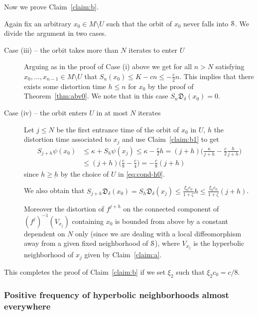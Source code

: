 \documentclass[reqno,12pt,a4paper]{amsart}
\theoremstyle{plain}
\theoremstyle{definition}
\begin{document}
Now we prove Claim~\ref{claim:b}.

Again fix an arbitrary $x_0\in M\setminus U$ such that the
orbit of $x_0$ never falls into ${\EuScript{S}}$. We divide the
argument in two cases.

\begin{description}
\item[Case (iii) -- the orbit takes more than $N$ iterates
  to enter $U$] Arguing as in the proof of Case (i) above we
  get for all $n > N$ satisfying $x_0,\dots, x_{n-1}\in
  M\setminus U$ that $ S_n(x_0)\le K - cn \le -\frac{c}2 n.$
  This implies that there exists some distortion time $h\le
  n$ for $x_0$ by the proof of Theorem~\ref{thm:abv0}. We
  note that in this case $S_n{{\mathfrak D}}_{\delta}(x_0)=0$.

\item[Case (iv) -- the orbit enters $U$ in at most $N$
  iterates] Let $j\le N$ be the first entrance time of the
  orbit of $x_0$ in $U$, $h$ the distortion time associated
  to $x_j$ and use Claim~\ref{claim:b1} to get
\begin{align*}
  S_{j+h}\psi(x_0)
  &\le
  \kappa + S_{h}\psi(x_{j})
  \le
  \kappa- \frac{c}2 h
  =
  (j+h)\Big( \frac{\kappa}{j+h}
  - \frac{c}2\frac{h}{j+h} \Big)
    \\
  &\le
  (j+h)\Big( \frac{c}8 - \frac{c}4\Big)=-\frac{c}8 (j+h)
\end{align*}
since $h\ge\underbar h$ by the choice of $U$ in
\eqref{eq:cond-h0}.

We also obtain that
$S_{j+h}{{\mathfrak D}}_{\delta}(x_0)=S_h{{\mathfrak D}}_\delta(x_j)\le
\frac{\xi_0c_0}{1+\zeta} h\le \frac{\xi_0c_0}{1+\zeta} (j+h)$.

Moreover the distortion of $f^{j+h}$ on the connected
component of $(f^j)^{-1}(V_{x_j})$ containing $x_0$ is
bounded from above by a constant dependent on $N$ only
(since we are dealing with a local diffeomorphism away from
a given fixed neighborhood of ${\EuScript{S}}$), where $V_{x_j}$ is the
hyperbolic neighborhood of $x_j$ given by
Claim~\ref{claim:a}.
\end{description}

This completes the proof of Claim~\ref{claim:b} if we set
$\xi_2$ such that $\xi_2 c_0 = c/8$.

\subsubsection{Positive frequency of hyperbolic
  neighborhoods almost everywhere}
\label{sec:positive-frequency-h}
\end{document}

